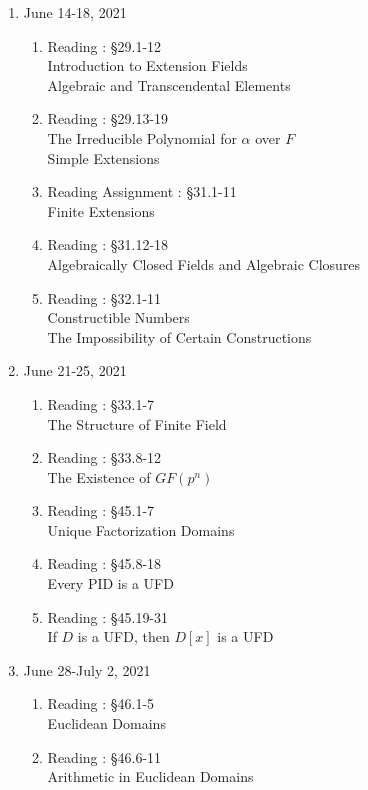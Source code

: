 \begin{enumerate}[label=Week \arabic*]
	\item June 14-18, 2021 %
	\begin{enumerate}[label=Day \arabic*]
		\item Reading : \S29.1-12\\
			Introduction to Extension Fields\\
			Algebraic and Transcendental Elements
		\item Reading : \S29.13-19\\
			The Irreducible Polynomial for $\alpha$ over $F$\\
			Simple Extensions
		\item Reading Assignment : \S31.1-11\\
			Finite Extensions
		\item Reading : \S31.12-18\\
			Algebraically Closed Fields and Algebraic Closures
		\item Reading : \S32.1-11\\
			Constructible Numbers\\
			The Impossibility of Certain Constructions
	\end{enumerate}
	\item June 21-25, 2021 %
	\begin{enumerate}[label=Day \arabic*]
		\item Reading : \S33.1-7\\
			The Structure of Finite Field
		\item Reading : \S33.8-12\\
			The Existence of $GF(p^n)$
		\item Reading : \S45.1-7\\
			Unique Factorization Domains
		\item Reading : \S45.8-18\\
			Every PID is a UFD
		\item Reading : \S45.19-31\\
			If $D$ is a UFD, then $D[x]$ is a UFD
	\end{enumerate}
	\item June 28-July 2, 2021 %
	\begin{enumerate}[label=Day \arabic*]
		\item Reading : \S46.1-5\\
			Euclidean Domains
		\item Reading : \S46.6-11\\
			Arithmetic in Euclidean Domains

\end{enumerate}
\end{enumerate}
